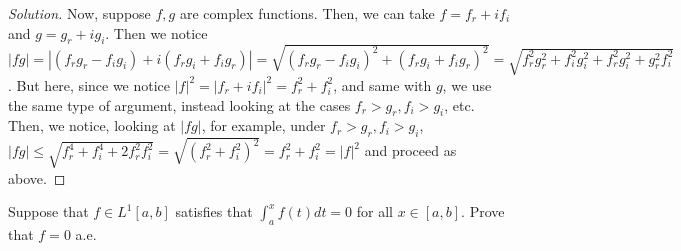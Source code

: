 \documentclass[10pt]{article}
\newenvironment{problem}[2][Problem]{\begin{trivlist}
\item[\hskip \labelsep {\bfseries #1}\hskip \labelsep {\bfseries #2.}]}{\end{trivlist}}
\begin{document}
\begin{proof}[Solution]
Now, suppose $f,g$ are complex functions. Then, we can take $f = f_r + i f_i$ and $g = g_r + i g_i$. Then we notice $|fg| = |(f_rg_r - f_ig_i) + i(f_rg_i + f_ig_r)| = \sqrt{(f_rg_r - f_ig_i)^2 + (f_rg_i + f_ig_r)^2} = \sqrt{f_r^2g_r^2 + f_i^2g_i^2 + f_r^2g_i^2 + g_r^2f_i^2}$. But here, since we notice $|f|^2 = |f_r + if_i|^2 = f_r^2 + f_i^2$, and same with $g$, we use the same type of argument, instead looking at the cases $f_r > g_r, f_i > g_i$, etc. Then, we notice, looking at $|fg|$, for example, under $f_r > g_r, f_i > g_i$, $|fg| \leq \sqrt{f_r^4 + f_i^4 + 2f_r^2 f_i^2} = \sqrt{(f_r^2 + f_i^2)^2} = f_r^2 + f_i^2 = |f|^2$ and proceed as above.
\end{proof}
 
\begin{problem}{4.4.22}
Suppose that $f \in L^1[a,b]$ satisfies that $\int_a^x f(t) dt = 0$ for all $x \in [a,b]$. Prove that $f = 0$ a.e.
\end{problem}
\end{document}

